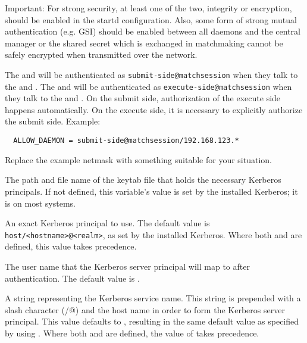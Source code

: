\begin{description}
  Important: For strong security, at least one of the two, integrity or
  encryption, should be enabled in the startd configuration.  Also, some
  form of strong mutual authentication (e.g. GSI) should be enabled
  between all daemons and the central manager or the shared secret which
  is exchanged in matchmaking cannot be safely encrypted when transmitted
  over the network.

  The  and  will be authenticated as
  \verb|submit-side@matchsession| when they talk to the  and
  .  The  and  will be authenticated as
  \verb|execute-side@matchsession| when they talk to the  and
  .  On the submit side, authorization of the execute side happens
  automatically.  On the execute side, it is necessary to explicitly
  authorize the submit side.  Example:

\begin{verbatim}
  ALLOW_DAEMON = submit-side@matchsession/192.168.123.*
\end{verbatim}

  Replace the example netmask with something suitable for your situation.

\label{param:KerberosServerKeytab}
\item[\Macro{KERBEROS\_SERVER\_KEYTAB}]
  The path and file name of the keytab file that holds the necessary Kerberos
  principals.
  If not defined, this variable's value is set by the installed Kerberos;
  it is  on most systems.

\label{param:KerberosServerPrincipal}
\item[\Macro{KERBEROS\_SERVER\_PRINCIPAL}]
  An exact Kerberos principal to use.
  The default value is \verb$host/<hostname>@<realm>$, as set by the
  installed Kerberos.
  Where both  and
   are defined, this value takes
  precedence.

\label{param:KerberosServerUser}
\item[\Macro{KERBEROS\_SERVER\_USER}]
  The user name that the Kerberos server principal will map to after
  authentication.
  The default value is \verb@condor@.

\label{param:KerberosServerService}
\item[\Macro{KERBEROS\_SERVER\_SERVICE}]
  A string representing the Kerberos service name.
  This string is prepended with a slash character (\verb@/@) and the host name
  in order to form the Kerberos server principal.
  This value defaults to \verb@host@, resulting in the same default value
  as specified by using .
  Where both  and
   are defined, the value of
   takes precedence.



\end{description}
